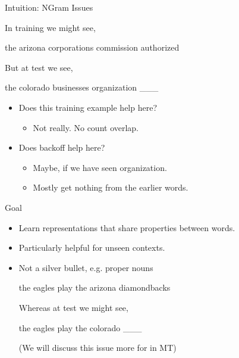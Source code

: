 \documentclass{beamer}
\begin{document}
\begin{frame}{Intuition: NGram Issues}
  
  In training we might see, 

  \begin{center}
    the arizona corporations commission \alert{authorized}
  \end{center}

  But at test we see, 
  \begin{center}
    the colorado businesses organization \alert{\_\_\_}
  \end{center}
  \pause 
  
  \begin{itemize}
  \item Does this training example help here?
    \begin{itemize}
    \item Not really. No count overlap.
    \end{itemize}
    \air 
    \pause 
  \item Does backoff help here? 
    \begin{itemize}
    \item Maybe, if we have seen organization.
    \item Mostly get nothing from the earlier words.
    \end{itemize}
  \end{itemize}
\end{frame}


\begin{frame}{Goal}
  \begin{itemize}
  \item Learn representations that share properties between words.

    \air
  \item Particularly helpful for unseen contexts.


   \air 

  \item Not a silver bullet, e.g. proper nouns



  \begin{center}
    the eagles play the arizona \alert{diamondbacks}
  \end{center}

  Whereas at test we might see, 

  \begin{center}
    the eagles play the colorado  \alert{\_\_\_}
  \end{center}  
  (We will discuss this issue more for in MT)
  \end{itemize}
\end{frame}
\end{document}
